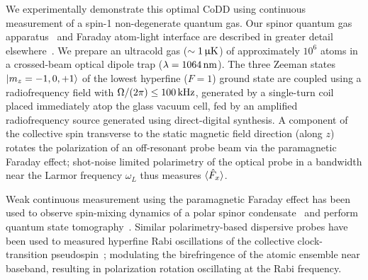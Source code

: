 \documentclass[aps,prl,reprint,superscriptaddress,floatfix]{revtex4-1}
\begin{document}
We experimentally demonstrate this optimal CoDD using continuous measurement of a spin-1 non-degenerate quantum gas.
Our spinor quantum gas apparatus~\cite{wood_magnetic_2015} and Faraday atom-light interface are described in greater detail elsewhere~\cite{jasperse_magic-wavelength_2017}.
We prepare an ultracold gas ($\sim \unit[1]{\upmu K}$) of approximately $10^6$ \Rb atoms in a crossed-beam optical dipole trap ($\lambda=\unit[1064]{nm}$).
The three Zeeman states $\vert m_z=-1,0,+1 \rangle $ of the lowest hyperfine ($F=1$) ground state are coupled using a radiofrequency field with $\Omega/(2\pi) \leq \unit[100]{kHz}$, generated by a single-turn coil placed immediately atop the glass vacuum cell, fed by an amplified radiofrequency source generated using direct-digital synthesis.
A component of the collective spin transverse to the static magnetic field direction (along $z$) rotates the polarization of an off-resonant probe beam via the paramagnetic Faraday effect; shot-noise limited polarimetry of the optical probe in a bandwidth near the Larmor frequency $\omega_L$ thus measures $\langle \hat{F}_x \rangle$.

Weak continuous measurement using the paramagnetic Faraday effect has been used to observe spin-mixing dynamics of a polar spinor condensate~\cite{liu_quantum_2009} and perform quantum state tomography~\cite{smith_continuous_2004,*smith_efficient_2006}.
Similar polarimetry-based dispersive probes have been used to measured hyperfine Rabi oscillations of the collective clock-transition pseudospin~\cite{chaudhury_continuous_2006}; modulating the birefringence of the atomic ensemble near baseband, resulting in polarization rotation oscillating at the Rabi frequency.
\end{document}
